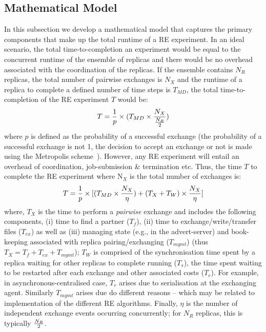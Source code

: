\documentclass{rspublic}
\newcommand{\alnote}[1]{ {\textcolor{blue} { ***andre: #1 }}}
\newcommand{\alnote}[1]{}
\begin{document}
\subsection{Mathematical Model}
\label{sec:math-model}
In this subsection we develop a mathematical model that captures
the primary components that make up the total runtime of a RE
experiment. In an ideal scenario, the total time-to-completion an
experiment would be equal to the concurrent runtime of the ensemble of
replicas and there would be no overhead associated with the
coordination of the replicas.  If the ensemble contains $N_R$
replicas, the total number of pairwise exchanges is $N_X$ and the
runtime of a replica to complete a defined number of time steps is
$T_{MD}$, the total time-to-completion of the RE experiment $T$ would
be:
\begin{eqnarray}
T = {1\over p} \times (T_{MD} \times  {N_X \over {N_R \over 2}}) 
\label{eq:totaltime}
\end{eqnarray}
where $p$ is defined as the probability of a successful exchange (the
probability of a successful exchange is not 1, the decision to accept
an exchange or not is made using the Metropolis
scheme~\citep{metropolis:1087}). However, any RE experiment will
entail an overhead of coordination, job-submission \& termination
etc. Thus, the time $T$ to complete the RE experiment where N$_X$ is
the total number of exchanges is:
\begin{eqnarray}
  T = {1\over p} \times [(T_{MD} \times  {N_X \over {\eta}}) +
  {(T_{X} + T_{W})} \times {N_X \over \eta}]
\label{eq:totaltime}
\end{eqnarray}
where, $T_{X}$ is the time to perform a {\it pairwise} exchange and
includes the following components, (i) time to find a partner ($T_f$),
(ii) time to exchange/write/transfer files ($T_{ex}$) as well as (iii)
managing state (e.g., in the advert-server) and book-keeping
associated with replica pairing/exchanging ($T_{mgmt}$) (thus $T_{X} =
T_{f} + T_{ex}+T_{mgmt}$); $T_W$ is comprised of the synchronisation
time spent by a replica waiting for other replicas to complete running
($T_s$), the time spent waiting to be restarted after each exchange
and other associated costs ($T_r$). For example, in
asynchronous-centralised case, $T_r$ arises due to serialisation at
the exchanging agent.  Similarly $T_{mgmt}$ arises due do different
reasons -- which may be related to
implementation %
of the different RE algorithms. Finally, $\eta$ is the number of
independent exchange events occurring concurrently; for $N_R$
replicas, this is typically $N_R \over 2$.
\end{document}
